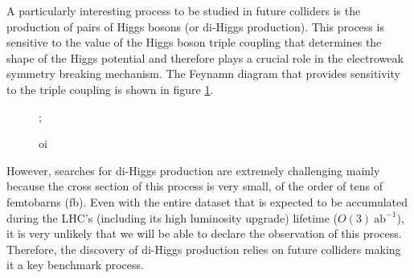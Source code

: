 A particularly interesting process to be studied in future colliders is the production of pairs of Higgs bosons (or di-Higgs production). This process is sensitive to the value of the Higgs boson triple coupling that determines the shape of the Higgs potential and therefore plays a crucial role in the electroweak symmetry breaking mechanism. The Feynamn diagram that provides sensitivity to the triple coupling is shown in figure \ref{fig:hh_diag}.

\begin{figure}[h]
	\centering
	;
	\label{fig:hh_diag}
	\caption{oi}
\end{figure}

However, searches for di-Higgs production are extremely challenging mainly because the cross section of this process is very small, of the order of tens of femtobarns (fb). Even with the entire dataset that is expected to be accumulated during the LHC's (including its high luminosity upgrade) lifetime ($O(3)~\text{ab}^{-1}$), it is very unlikely that we will be able to declare the observation of this process. Therefore, the discovery of di-Higgs production relies on future colliders making it a key benchmark process.

